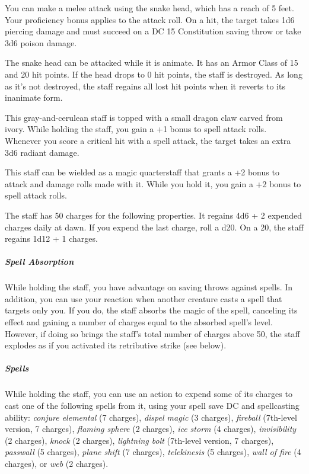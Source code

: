 \documentclass[10pt,a4paper,twoside,bg=print,twocolumn,openany,nodeprecatedcode]{dndbook}
\begin{document}
You can make a melee attack using the snake head, which has a reach of 5 feet. Your proficiency bonus applies to the attack roll. On a hit, the target takes 1d6 piercing damage and must succeed on a DC 15 Constitution saving throw or take 3d6 poison damage.

The snake head can be attacked while it is animate. It has an Armor Class of 15 and 20 hit points. If the head drops to 0 hit points, the staff is destroyed. As long as it's not destroyed, the staff regains all lost hit points when it reverts to its inanimate form.

This gray-and-cerulean staff is topped with a small dragon claw carved from ivory. While holding the staff, you gain a +1 bonus to spell attack rolls. Whenever you score a critical hit with a spell attack, the target takes an extra 3d6 radiant damage.

This staff can be wielded as a magic quarterstaff that grants a +2 bonus to attack and damage rolls made with it. While you hold it, you gain a +2 bonus to spell attack rolls.

The staff has 50 charges for the following properties. It regains 4d6 + 2 expended charges daily at dawn. If you expend the last charge, roll a d20. On a 20, the staff regains 1d12 + 1 charges.

\subparagraph{Spell Absorption}
While holding the staff, you have advantage on saving throws against spells. In addition, you can use your reaction when another creature casts a spell that targets only you. If you do, the staff absorbs the magic of the spell, canceling its effect and gaining a number of charges equal to the absorbed spell's level. However, if doing so brings the staff's total number of charges above 50, the staff explodes as if you activated its retributive strike (see below).

\subparagraph{Spells}
While holding the staff, you can use an action to expend some of its charges to cast one of the following spells from it, using your spell save DC and spellcasting ability: \textit{conjure elemental} (7 charges), \textit{dispel magic} (3 charges), \textit{fireball} (7th-level version, 7 charges), \textit{flaming sphere} (2 charges), \textit{ice storm} (4 charges), \textit{invisibility} (2 charges), \textit{knock} (2 charges), \textit{lightning bolt} (7th-level version, 7 charges), \textit{passwall} (5 charges), \textit{plane shift} (7 charges), \textit{telekinesis} (5 charges), \textit{wall of fire} (4 charges), or \textit{web} (2 charges).
\end{document}
